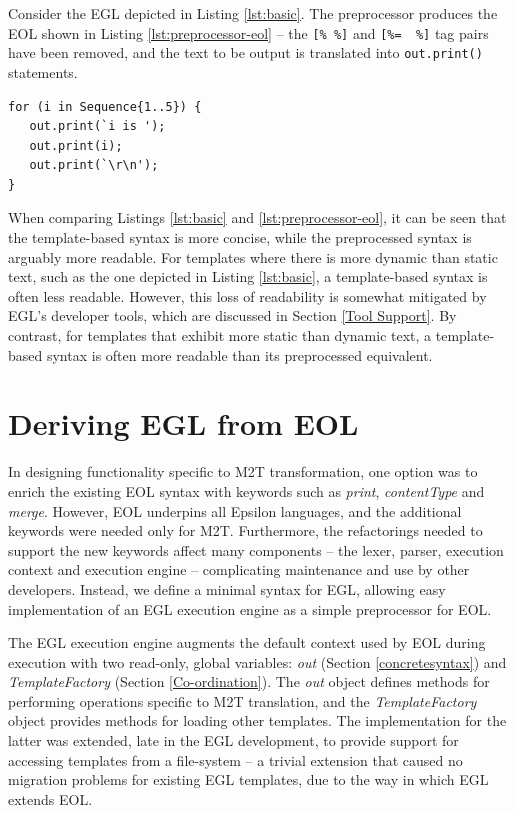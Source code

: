 Consider the EGL depicted in Listing \ref{lst:basic}.  The
preprocessor produces the EOL
shown in Listing
\ref{lst:preprocessor-eol} -- the \verb|[% %]| and \verb|[%=  %]| tag pairs have been removed, and the text to be output is translated into \verb|out.print()| statements.

\begin{lstlisting}[basicstyle=\ttfamily\footnotesize, tabsize=2, flexiblecolumns=true, caption=Resulting EOL generated by the preprocessor., label=lst:preprocessor-eol]
for (i in Sequence{1..5}) {
   out.print(`i is ');
   out.print(i);
   out.print(`\r\n');
}
\end{lstlisting}

When comparing Listings \ref{lst:basic} and \ref{lst:preprocessor-eol}, it can be seen that the template-based syntax is more concise, while the preprocessed syntax is arguably more readable. For templates where there is more dynamic than static text, such as the one depicted in Listing \ref{lst:basic}, a template-based syntax is often less readable. However, this loss of readability is somewhat mitigated by EGL's developer tools, which are discussed in Section \ref{Tool Support}. By contrast, for templates that exhibit more static than dynamic text, a template-based syntax is often more readable than its preprocessed equivalent.

\section{Deriving EGL from EOL}

In designing functionality specific to M2T transformation, one option
was to 
enrich the existing EOL syntax with  keywords such as \emph{print}, \emph{contentType} 
and \emph{merge}.  However, EOL underpins all Epsilon
languages, and the additional keywords were needed only for M2T.
Furthermore, the refactorings needed to support the new keywords
affect many components -- the lexer, parser, execution context and
execution engine -- complicating maintenance and use by other developers.
Instead, we define a minimal syntax for EGL, allowing easy
implementation of an EGL execution engine as a simple preprocessor for EOL. 
 

The EGL execution engine augments the default context used by EOL
during execution with two read-only, global variables: \emph{out}
(Section \ref{concretesyntax}) and \emph{TemplateFactory} (Section
\ref{Co-ordination}). The \emph{out} object defines methods for
performing operations specific to M2T translation, and the
\emph{TemplateFactory} object provides methods for loading other
templates. The implementation for the latter was extended, late in the
EGL development, to provide support for accessing templates from a
file-system -- a trivial extension that caused no migration problems
for existing EGL templates, due to the way in which EGL extends EOL.

